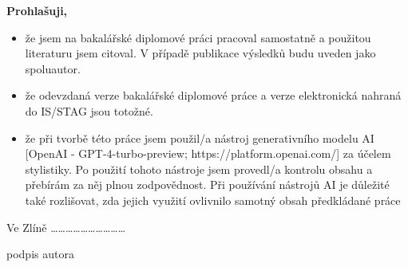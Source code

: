 {{	\bigskip
	
	
	\textbf{Prohlašuji,}
	
	\begin{itemize}
		\setlength{\parskip}{0pt}
		\setlength{\itemsep}{0pt}
		\item{že jsem na \ifbp bakalářské \else \ifdp diplomové \fi \fi práci pracoval samostatně a použitou literaturu jsem citoval. V případě publikace výsledků budu uveden jako spoluautor.}
		\item{že odevzdaná verze \ifbp bakalářské \else \ifdp diplomové \fi \fi práce a verze elektronická nahraná do IS/STAG jsou totožné.}
		\item{že při tvorbě této práce jsem použil/a nástroj generativního modelu AI [OpenAI - GPT-4-turbo-preview; https://platform.openai.com/] za účelem stylistiky. Po použití tohoto nástroje jsem provedl/a kontrolu obsahu a přebírám za něj plnou zodpovědnost. Při používání nástrojů AI je důležité také rozlišovat, zda jejich využití ovlivnilo samotný obsah předkládané práce}
	\end{itemize}
	
	\bigskip
	
	Ve Zlíně \hspace{7.2cm}\dots\dots\dots\dots\dots\dots\dots\dots\dots\dots
	
	\hspace{10.4cm}podpis autora
}}

